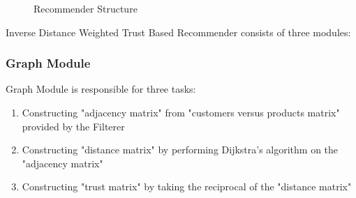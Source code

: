 \label{inverse_section}
	\begin{figure}[H]
		\centering
		\caption{Recommender Structure}
		\label{fig:inverse_structure}
	\end{figure}
	Inverse Distance Weighted Trust Based Recommender consists of three modules:
	
	\subsubsection{Graph Module} Graph Module is responsible for three tasks:
	\begin{enumerate}
		\item Constructing "adjacency matrix" from "customers versus products matrix" provided by the Filterer
		\item Constructing "distance matrix" by performing Dijkstra's algorithm on the "adjacency matrix"
		\item Constructing "trust matrix" by taking the reciprocal of the "distance matrix"
	\end{enumerate}
